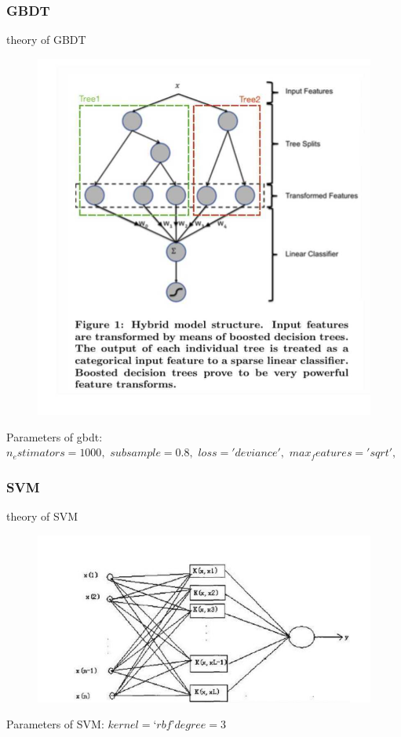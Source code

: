 \documentclass{article}
\begin{document}
\subsubsection{GBDT}
theory of GBDT
 \begin{figure}[H]
\centering
  \includegraphics[width=.8\textwidth]{3-6.png} %
  \end{figure}
Parameters of gbdt:\\
    $n_estimators=1000,$
    $subsample=0.8,$
    $loss='deviance',$
    $max_features='sqrt',$

  \subsubsection{SVM}
 theory of SVM
  \begin{figure}[H]
\centering
  \includegraphics[width=.8\textwidth]{3-7.png} %
  \end{figure}
Parameters of SVM:
$
kernel=‘rbf’
degree=3
$
\end{document}
